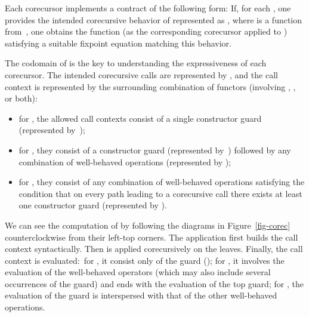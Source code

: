\documentclass[preprint,draft]
{sigplanconf}
\newcommand{\<}{\langle}
\renewcommand{\>}{\rangle}
\begin{document}
Each corecursor implements a contract of the following form:
If, for each , one provides the intended corecursive behavior of  represented as ,
where  is a function
from~,
one obtains the function  (as the corresponding corecursor applied to ) satisfying a suitable fixpoint equation matching this behavior.

The codomain of  is the key to understanding the expressiveness of each corecursor.
The intended corecursive calls are represented by ,
and the call context is represented by the surrounding
combination of functors (involving , , or both):
\begin{itemize}
\item for , the allowed call contexts consist of a single constructor guard (represented by~);
\item for , they consist of a constructor guard (represented by~) followed by any combination of well-behaved
operations  (represented by );
\item for , they consist of any combination of well-behaved operations
satisfying the condition that on every path leading to a corecursive call there exists at least one constructor guard
(represented by ).
\end{itemize}
We can see the computation of 
by following the diagrams in Figure~\ref{fig-corec} counterclockwise from their left-top corners.
The application  first builds the call context {syntactically}.
Then  is applied corecursively on the leaves.
Finally, the call context is evaluated:\ for , it consist only of the guard ();
for , it involves the evaluation of the well-behaved operators (which may also include several occurrences of the guard)
and ends with
the evaluation of the top guard;
for , the evaluation of the guard is
interspersed with that of the other well-behaved operations.
\end{document}
